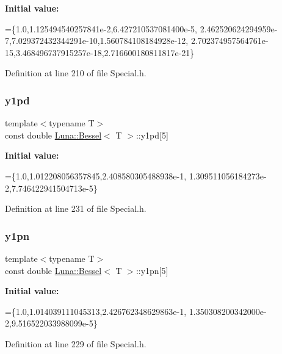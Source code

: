 {\bfseries Initial value\+:}
\begin{DoxyCode}
=\{1.0,1.125494540257841e-2,6.427210537081400e-5,
        2.462520624294959e-7,7.029372432344291e-10,1.560784108184928e-12,
        2.702374957564761e-15,3.468496737915257e-18,2.716600180811817e-21\}
\end{DoxyCode}


Definition at line 210 of file Special.\+h.

\mbox{\label{structLuna_1_1Bessel_a22637ff3011249c465d3970c92edc83e}} 
\subsubsection{\texorpdfstring{y1pd}{y1pd}}
{\footnotesize\ttfamily template$<$typename T$>$ \\
const double \hyperlink{structLuna_1_1Bessel}{Luna\+::\+Bessel}$<$ T $>$\+::y1pd\mbox{[}5\mbox{]}}

{\bfseries Initial value\+:}
\begin{DoxyCode}
=\{1.0,1.012208056357845,2.408580305488938e-1,
        1.309511056184273e-2,7.746422941504713e-5\}
\end{DoxyCode}


Definition at line 231 of file Special.\+h.

\mbox{\label{structLuna_1_1Bessel_af161635651020ba0c10099888ad348ac}} 
\subsubsection{\texorpdfstring{y1pn}{y1pn}}
{\footnotesize\ttfamily template$<$typename T$>$ \\
const double \hyperlink{structLuna_1_1Bessel}{Luna\+::\+Bessel}$<$ T $>$\+::y1pn\mbox{[}5\mbox{]}}

{\bfseries Initial value\+:}
\begin{DoxyCode}
=\{1.0,1.014039111045313,2.426762348629863e-1,
        1.350308200342000e-2,9.516522033988099e-5\}
\end{DoxyCode}


Definition at line 229 of file Special.\+h.

\mbox{\label{structLuna_1_1Bessel_a69de10ab8f83dd702c5fbea8b2033e43}} 
